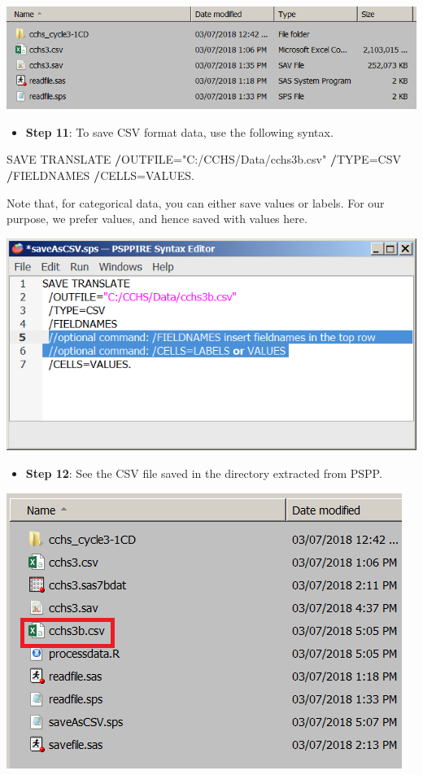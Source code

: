 \documentclass[
]{book}
\newenvironment{Shaded}{\begin{snugshade}}{\end{snugshade}}
\newcommand{\NormalTok}[1]{#1}
\newcommand{\OperatorTok}[1]{\textcolor[rgb]{0.81,0.36,0.00}{\textbf{#1}}}
\newcommand{\StringTok}[1]{\textcolor[rgb]{0.31,0.60,0.02}{#1}}
\providecommand{\tightlist}{%
  \setlength{\itemsep}{0pt}\setlength{\parskip}{0pt}}
\begin{document}
\includegraphics[width=0.65\linewidth]{images/abacus40}

\begin{itemize}
\tightlist
\item
  \textbf{Step 11}: To save CSV format data, use the following syntax.
\end{itemize}

\begin{Shaded}
\begin{Highlighting}[]
\NormalTok{SAVE TRANSLATE}
  \OperatorTok{/}\NormalTok{OUTFILE=}\StringTok{"C:/CCHS/Data/cchs3b.csv"}  
  \OperatorTok{/}\NormalTok{TYPE=CSV}
  \OperatorTok{/}\NormalTok{FIELDNAMES      }
  \OperatorTok{/}\NormalTok{CELLS=VALUES.}
\end{Highlighting}
\end{Shaded}

Note that, for categorical data, you can either save values or labels. For our purpose, we prefer values, and hence saved with values here.

\includegraphics[width=0.65\linewidth]{images/abacus41}

\begin{itemize}
\tightlist
\item
  \textbf{Step 12}: See the CSV file saved in the directory extracted from PSPP.
\end{itemize}

\includegraphics[width=0.65\linewidth]{images/abacus42}
\end{document}
